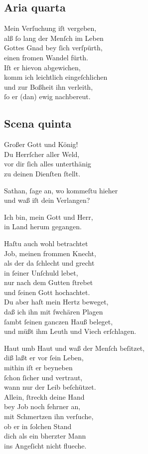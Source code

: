 \documentclass{ees}
\newenvironment{lyrics}[1]{%
  \subsection{#1}\nopagebreak%
  \begin{lyricslist}%
  \let\voice\item%
}{%
  \end{lyricslist}%
}
\begin{document}
\begin{lyrics}{Aria quarta}
  \voice[Leviathan]
  Mein Verſuchung iſt vergeben,\\
  alß ſo lang der Menſch im Leben\\
  Gottes Gnad bey ſich verſpürth,\\
  einen fromen Wandel fürth.\\[1ex]
  Iſt er hievon abgewichen,\\
  komm ich leichtlich eingeſchlichen\\
  und zur Boßheit ihn verleith,\\
  ſo er (dan) ewig nachbereut.
\end{lyrics}

\begin{lyrics}{Scena quinta}
  \voice[Die Kinder Gottes]
  Großer Gott und König!\\
  Du Herrſcher aller Weld,\\
  vor dir ſich alles unterthänig\\
  zu deinen Dienſten ſtellt.

  \voice[Schöpffer]
  Sathan, ſage an, wo kommeſtu hieher\\
  und waß iſt dein Verlangen?

  \voice[Leviathan]
  Ich bin, mein Gott und Herr,\\
  in Land herum gegangen.

  \voice[Schöpffer]
  Haſtu auch wohl betrachtet\\
  Job, meinen frommen Knecht,\\
  als der da ſchlecht und grecht\\
  in ſeiner Unſchuld lebet,\\
  nur nach dem Gutten ſtrebet\\
  und ſeinen Gott hochachtet.\\
  Du aber haſt mein Hertz beweget,\\
  daß ich ihn mit ſwchären Plagen\\
  ſambt ſeinen ganczen Hauß beleget,\\
  und müßt ihm Leuth und Viech erſchlagen.

  \voice[Leviathan]
  Haut umb Haut und waß der Menſch beſitzet,\\
  diß laßt er vor ſein Leben,\\
  mithin iſt er beyneben\\
  ſchon ſicher und vertraut,\\
  wann nur der Leib beſchützet.\\
  Allein, ſtreckh deine Hand\\
  bey Job noch fehrner an,\\
  mit Schmertzen ihn verſuche,\\
  ob er in ſolchen Stand\\
  dich als ein bherzter Mann\\
  ins Angeſicht nicht flueche.


\end{lyrics}
\end{document}

